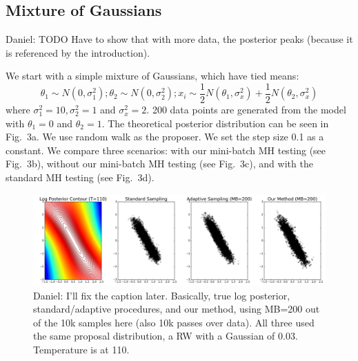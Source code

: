 \documentclass{article}
\begin{document}
\subsection{Mixture of Gaussians}\label{ssec:gaussians}

{\color{blue}
Daniel: TODO Have to show that with more data, the posterior peaks (because it is referenced by the
introduction).
}

We start with a simple mixture of Gaussians, which have tied means:
\[
\theta_1 \sim N(0, \sigma_1^2); \theta_2 \sim N(0, \sigma_2^2); x_i \sim \frac{1}{2}N(\theta_1, \sigma_x^2) + \frac{1}{2} N(\theta_2, \sigma_x^2)
\]
where $\sigma_1^2 = 10, \sigma_2^2 = 1$ and $\sigma_x^2=2$. 200 data points are generated from the
model with $\theta_1 = 0$ and $\theta_2 = 1$. The theoretical posterior distribution can be seen in
Fig.~3a. We use random walk as the proposer. We set the step size 0.1 as a constant. We compare
three scenarios: with our mini-batch MH testing (see Fig.~3b), without our mini-batch MH testing
(see Fig.~3c), and with the standard MH testing (see Fig.~3d). 

\begin{figure}[t]
    \centering
    \includegraphics[width=1\linewidth]{cloud_v01.png}
    \caption{
    {\color{blue}
    Daniel: I'll fix the caption later. Basically, true log posterior, standard/adaptive procedures,
    and our method, using MB=200 out of the 10k samples here (also 10k passes over data). All three
    used the same proposal distribution, a RW with a Gaussian of 0.03. Temperature is at 110.
    }
    }
\end{figure}
\end{document}
